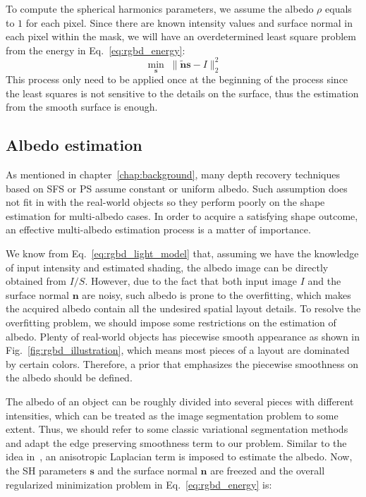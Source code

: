 
To compute the spherical harmonics parameters, we assume the albedo $\rho$ equals to $1$ for each pixel. 
Since there are known intensity values and surface normal in each pixel within the mask, we will have an overdetermined least square problem from the energy in Eq.~\ref{eq:rgbd_energy}: 
\begin{equation}\label{eq:rgbd_light_estimate}
\min_{\mathbf{s}} \; \lVert \tilde{\mathbf{n}} \mathbf{s} - I \rVert^2_2
\end{equation}
This process only need to be applied once at the beginning of the process since the least squares is not sensitive to the details on the surface, thus the estimation from the smooth surface is enough.

\subsection{Albedo estimation}\label{sec:rgbd_albedo_estimation}
As mentioned in chapter~\ref{chap:background}, many depth recovery techniques based on SFS or PS assume constant or uniform albedo.
Such assumption does not fit in with the real-world objects so they perform poorly on the shape estimation for multi-albedo cases.
In order to acquire a satisfying shape outcome, an effective multi-albedo estimation process is a matter of importance.

We know from Eq.~\ref{eq:rgbd_light_model} that, assuming we have the knowledge of input intensity and estimated shading, the albedo image can be directly obtained from $I/S$.
However, due to the fact that both input image $I$ and the surface normal $\mathbf{n}$ are noisy, such albedo is prone to the overfitting, which makes the acquired albedo contain all the undesired spatial layout details.
To resolve the overfitting problem, we should impose some restrictions on the estimation of albedo.
Plenty of real-world objects has piecewise smooth appearance as shown in Fig.~\ref{fig:rgbd_illustration}, which means most pieces of a layout are dominated by certain colors.
Therefore, a prior that emphasizes the piecewise smoothness on the albedo should be defined.

The albedo of an object can be roughly divided into several pieces with different intensities, which can be treated as the image segmentation problem to some extent. 
Thus, we should refer to some classic variational segmentation methods and adapt the edge preserving smoothness term to our problem.
Similar to the idea in~\cite{casaca2014laplacian}, an anisotropic Laplacian term is imposed to estimate the albedo.
Now, the SH parameters $\mathbf{s}$ and the surface normal $\mathbf{n}$ are freezed and the overall regularized minimization problem in Eq.~\ref{eq:rgbd_energy} is:

